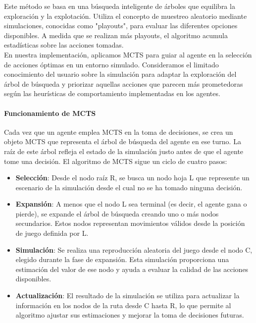 \documentclass[11pt]{article}
\begin{document}
Este método se basa en una búsqueda inteligente de árboles que equilibra la exploración y la explotación. Utiliza el concepto de muestreo aleatorio mediante simulaciones, conocidas como "playouts", para evaluar las diferentes opciones disponibles. A medida que se realizan más playouts, el algoritmo acumula estadísticas sobre las acciones tomadas.\\

En nuestra implementación, aplicamos MCTS para guiar al agente en la selección de acciones óptimas en un entorno simulado. Consideramos el limitado conocimiento del usuario sobre la simulación para adaptar la exploración del árbol de búsqueda y priorizar aquellas acciones que parecen más prometedoras según las heurísticas de comportamiento implementadas en los agentes.\\

\paragraph{Funcionamiento de MCTS}
Cada vez que un agente emplea MCTS en la toma de decisiones, se crea un objeto MCTS que representa el árbol de búsqueda del agente en ese turno. La raíz de este árbol refleja el estado de la simulación justo antes de que el agente tome una decisión. El algoritmo de MCTS sigue un ciclo de cuatro pasos:\\

\begin{itemize}
\item \textbf{Selección}: Desde el nodo raíz R, se busca un nodo hoja L que represente un escenario de la simulación desde el cual no se ha tomado ninguna decisión. 
\item \textbf{Expansión}: A menos que el nodo L sea terminal (es decir, el agente gana o pierde), se expande el árbol de búsqueda creando uno o más nodos secundarios. Estos nodos representan movimientos válidos desde la posición de juego definida por L.
\item \textbf{Simulación}: Se realiza una reproducción aleatoria del juego desde el nodo C, elegido durante la fase de expansión. Esta simulación proporciona una estimación del valor de ese nodo y ayuda a evaluar la calidad de las acciones disponibles.
\item \textbf{Actualización}: El resultado de la simulación se utiliza para actualizar la información en los nodos de la ruta desde C hasta R, lo que permite al algoritmo ajustar sus estimaciones y mejorar la toma de decisiones futuras.
\end{itemize}
\end{document}
